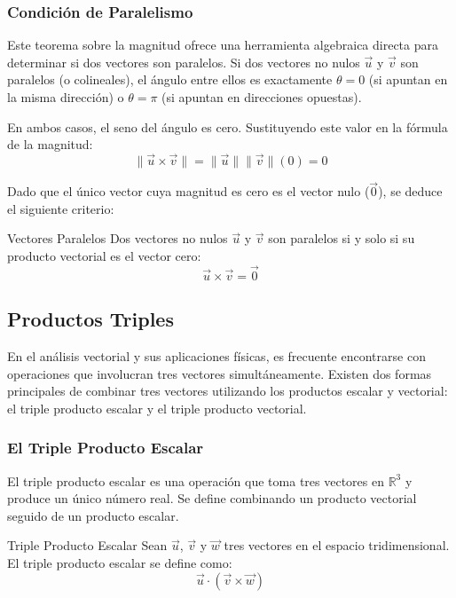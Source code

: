 \subsubsection{Condición de Paralelismo}

Este teorema sobre la magnitud ofrece una herramienta algebraica directa para determinar si dos vectores son paralelos. Si dos vectores no nulos $\vec{u}$ y $\vec{v}$ son paralelos (o colineales), el ángulo entre ellos es exactamente $\theta = 0$ (si apuntan en la misma dirección) o $\theta = \pi$ (si apuntan en direcciones opuestas).

En ambos casos, el seno del ángulo es cero. Sustituyendo este valor en la fórmula de la magnitud:
\[ \|\vec{u} \times \vec{v}\| = \|\vec{u}\| \|\vec{v}\| (0) = 0 \]

Dado que el único vector cuya magnitud es cero es el vector nulo ($\vec{0}$), se deduce el siguiente criterio:

\begin{mytheorem}{Vectores Paralelos}
Dos vectores no nulos $\vec{u}$ y $\vec{v}$ son paralelos si y solo si su producto vectorial es el vector cero:
\[ \vec{u} \times \vec{v} = \vec{0} \]
\end{mytheorem}

\subsection{Productos Triples}

En el análisis vectorial y sus aplicaciones físicas, es frecuente encontrarse con operaciones que involucran tres vectores simultáneamente. Existen dos formas principales de combinar tres vectores utilizando los productos escalar y vectorial: el triple producto escalar y el triple producto vectorial.

\subsubsection{El Triple Producto Escalar}

El triple producto escalar es una operación que toma tres vectores en $\mathbb{R}^3$ y produce un único número real. Se define combinando un producto vectorial seguido de un producto escalar.

\begin{mydefinition}{Triple Producto Escalar}
Sean $\vec{u}$, $\vec{v}$ y $\vec{w}$ tres vectores en el espacio tridimensional. El triple producto escalar se define como:
\[ \vec{u} \cdot (\vec{v} \times \vec{w}) \]
\end{mydefinition}

